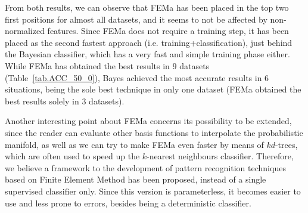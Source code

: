 From both results, we can observe that FEMa has been placed in the top two first positions for almost all datasets, and it seems to not be affected by non-normalized features. Since FEMa does not require a training step, it has been placed as the second fastest approach (i.e. training+classification), just behind the Bayesian classifier, which has a very fast and simple training phase either. While FEMa has obtained the best results in $9$ datasets (Table~\ref{tab.ACC_50_0}), Bayes achieved the most accurate results in $6$ situations, being the sole best technique in only one dataset (FEMa obtained the best results solely in $3$ datasets).

Another interesting point about FEMa concerns its possibility to be extended, since the reader can evaluate other basis functions to interpolate the probabilistic manifold, as well as we can try to make FEMa even faster by means of $kd$-trees, which are often used to speed up the $k$-nearest neighbours classifier. Therefore, we believe a framework to the development of pattern recognition techniques based on Finite Element Method has been proposed, instead of a single supervised classifier only. Since this version is parameterless, it becomes easier to use and less prone to errors, besides being a deterministic classifier.